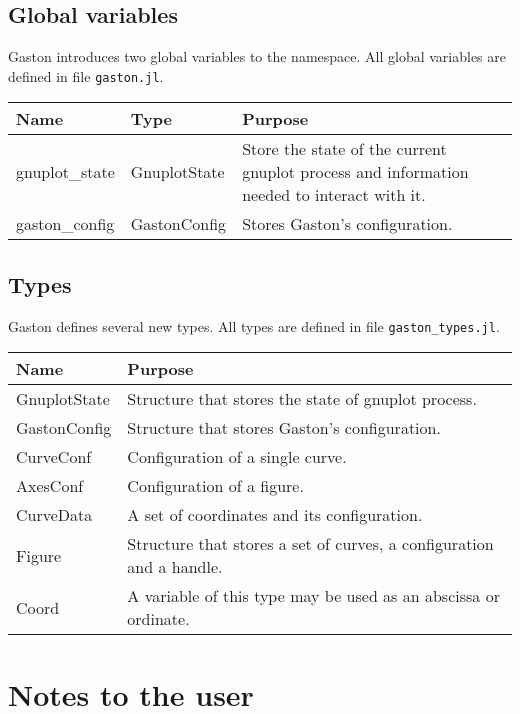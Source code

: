 \documentclass[11pt]{article}
\newcommand{\cmd}[1]{\texttt{#1}}
\begin{document}
\subsection{Global variables}

Gaston introduces two global variables to the namespace. All global variables
are defined in file \cmd{gaston.jl}.

\begin{center}
	\begin{tabular}{llp{7cm}}
		\toprule
		\textbf{Name} & \textbf{Type} & \textbf{Purpose} \\
		\midrule
		gnuplot\_state & GnuplotState & Store the state of the current gnuplot
		process and information needed to interact with it. \\
		gaston\_config & GastonConfig & Stores Gaston's configuration.\\
		\bottomrule
	\end{tabular}
\end{center}

\subsection{Types}

Gaston defines several new types. All types are defined in file
\cmd{gaston\_types.jl}.

\begin{center}
	\begin{tabular}{lp{8cm}}
		\toprule
		\textbf{Name} & \textbf{Purpose} \\
		\midrule
		GnuplotState & Structure that stores the state of gnuplot process. \\
		GastonConfig & Structure that stores Gaston's configuration. \\
		CurveConf & Configuration of a single curve. \\
		AxesConf & Configuration of a figure. \\
		CurveData & A set of coordinates and its configuration. \\
		Figure & Structure that stores a set of curves, a configuration and a
		handle. \\
		Coord & A variable of this type may be used as an abscissa or ordinate. \\
		\bottomrule
	\end{tabular}
\end{center}

\section{Notes to the user}
\end{document}

